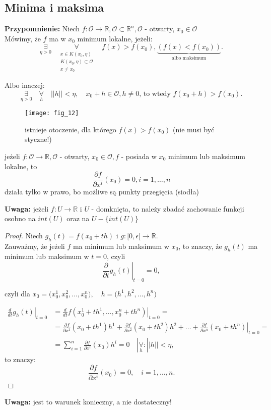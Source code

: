 \documentclass[../main.tex]{subfiles}
\begin{document}
\pagebreak
\subsection{Minima i maksima}
\textbf{Przypomnienie:}
Niech $f: \mathcal{O}\to \mathbb{R}, \mathcal{O}\subset \mathbb{R}^n, \mathcal{O}$ - otwarty, $x_0 \in \mathcal{O}$\\
Mówimy, że $f$ ma w $x_0$ minimum lokalne, jeżeli:
\[
    \underset{\eta > 0}{\exists} \quad
\underset{\substack{
x\in K(x_0,\eta)\\
K(x_0,\eta) \subset \mathcal{O}\\
x \neq x_0
}}{\forall} \quad f(x) > f(x_0), \underbrace{\left(f(x) < f(x_0)\right)}_{\text{albo maksimum}}.
\]

Albo inaczej:
\[
    \underset{\eta > 0}{\exists} \quad\underset{h}{\forall}\quad ||h|| < \eta, \quad x_0+h \in \mathcal{O}, h \neq 0\text{, to wtedy } f(x_0+h)>f(x_0).
\]

\begin{figure}[h]
    \centering
    \texttt{[image: fig\_12]}
    \caption{istnieje otoczenie, dla którego  $f(x)>f(x_0)$ (nie musi być styczne!)}
\end{figure}

\begin{stw}
jeżeli $f: \mathcal{O} \rightarrow \mathbb{R}, \mathcal{O}$ - otwarty, $x_0 \in \mathcal{O}, f$ - posiada w $x_0$ minimum lub maksimum lokalne, to $$\frac{\partial f}{\partial x^i} (x_0) = 0, i = 1,\dots,n$$
działa tylko w prawo, bo możliwe są punkty przegięcia (siodła)
\end{stw}

\textbf{Uwaga:} jeżeli $f: U\to \mathbb{R}$ i $U$ - domknięta, to należy zbadać zachowanie funkcji osobno na $int(U)$ oraz na $U - \{int(U)\}$

\begin{proof}

Niech $g_h (t) = f(x_0+th) \text{ i } g: [0,\epsilon [ \to \mathbb{R}$.\\
Zauważmy, że jeżeli $f$ ma minimum lub maksimum w $x_0$, to znaczy, że $g_h (t)$ ma minimum lub maksimum w $t = 0$, czyli
\[
    \left . \frac{\partial}{\partial t} g_h(t) \right |_{t=0} = 0,
\]

czyli dla $x_0 = \big ( x_0^1, x_0^2, \dots, x_0^n),\quad h = \big ( h^1, h^2, \dots, h^n)$

\begin{align*}
    \left . \frac{d}{dt} g_h (t) \right |_{t=0} &= \left .\frac{d}{dt} f(x_0^1 + th^1, \dots, x_0^n + th^n) \right |_{t=0} = \\
&= \frac{\partial f}{\partial x^1} (x_0 + th^1) h^1 + \frac{\partial f}{\partial x^2} (x_0 + th^2) h^2 + \dots + \left .\frac{\partial f}{\partial x^n} (x_0 + th^n) \right |_{t=0}=\\
&=\sum_{i=1}^n \frac{\partial f}{\partial x^i} (x_0) h^i = 0 \quad |\underset{h}{\forall}: ||h|| < \eta
,\end{align*}
to znaczy:
\[
    \frac{\partial f}{\partial x^i} (x_0) = 0,\quad i = 1,\dots,n.
\]
\end{proof}
\textbf{Uwaga: } jest to warunek konieczny, a nie dostateczny!
\end{document}
